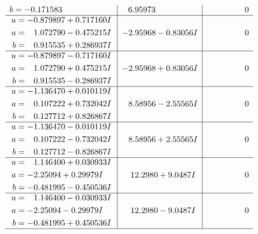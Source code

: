 \documentclass[1p]{elsarticle_modified}
\theoremstyle{definition}
\begin{document}
$$\begin{array}{c|c|c}
\begin{aligned}
b &= -0.171583\phantom{ +0.000000I}\end{aligned}
 & \phantom{-}6.95973\phantom{ +0.000000I} & \phantom{-0.000000 } 0 \\ \hline\begin{aligned}
u &= -0.879897 + 0.717160 I \\
a &= \phantom{-}1.072790 - 0.475215 I \\
b &= \phantom{-}0.915535 + 0.286937 I\end{aligned}
 & -2.95968 - 0.83056 I & \phantom{-0.000000 } 0 \\ \hline\begin{aligned}
u &= -0.879897 - 0.717160 I \\
a &= \phantom{-}1.072790 + 0.475215 I \\
b &= \phantom{-}0.915535 - 0.286937 I\end{aligned}
 & -2.95968 + 0.83056 I & \phantom{-0.000000 } 0 \\ \hline\begin{aligned}
u &= -1.136470 + 0.010119 I \\
a &= \phantom{-}0.107222 + 0.732042 I \\
b &= \phantom{-}0.127712 + 0.826867 I\end{aligned}
 & \phantom{-}8.58956 - 2.55565 I & \phantom{-0.000000 } 0 \\ \hline\begin{aligned}
u &= -1.136470 - 0.010119 I \\
a &= \phantom{-}0.107222 - 0.732042 I \\
b &= \phantom{-}0.127712 - 0.826867 I\end{aligned}
 & \phantom{-}8.58956 + 2.55565 I & \phantom{-0.000000 } 0 \\ \hline\begin{aligned}
u &= \phantom{-}1.146400 + 0.030933 I \\
a &= -2.25094 + 0.29979 I \\
b &= -0.481995 - 0.450536 I\end{aligned}
 & \phantom{-}12.2980 + 9.0487 I & \phantom{-0.000000 } 0 \\ \hline\begin{aligned}
u &= \phantom{-}1.146400 - 0.030933 I \\
a &= -2.25094 - 0.29979 I \\
b &= -0.481995 + 0.450536 I\end{aligned}
 & \phantom{-}12.2980 - 9.0487 I & \phantom{-0.000000 } 0\\
 \hline 

\end{array}$$
\end{document}
